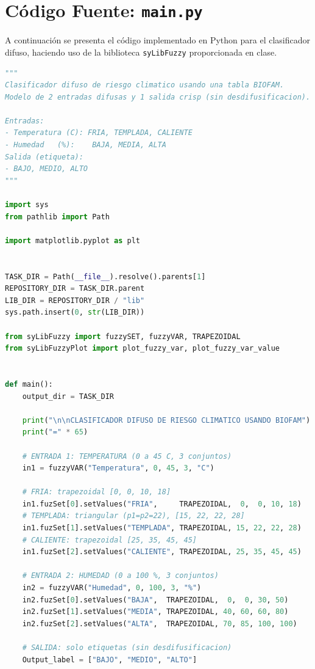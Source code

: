 \documentclass[conference]{IEEEtran}
\begin{document}
\clearpage
\onecolumn
\appendices
\section{Código Fuente: \texttt{main.py}}
\label{app:codigo}

A continuación se presenta el código implementado en Python para el clasificador difuso, haciendo uso de la biblioteca \texttt{syLibFuzzy} proporcionada en clase.

\begin{lstlisting}[language=Python, caption={Implementación del clasificador difuso climático.}]
"""
Clasificador difuso de riesgo climatico usando una tabla BIOFAM.
Modelo de 2 entradas difusas y 1 salida crisp (sin desdifusificacion).

Entradas:
- Temperatura (C): FRIA, TEMPLADA, CALIENTE
- Humedad   (%):    BAJA, MEDIA, ALTA
Salida (etiqueta):
- BAJO, MEDIO, ALTO
"""

import sys
from pathlib import Path

import matplotlib.pyplot as plt


TASK_DIR = Path(__file__).resolve().parents[1]
REPOSITORY_DIR = TASK_DIR.parent
LIB_DIR = REPOSITORY_DIR / "lib"
sys.path.insert(0, str(LIB_DIR))

from syLibFuzzy import fuzzySET, fuzzyVAR, TRAPEZOIDAL
from syLibFuzzyPlot import plot_fuzzy_var, plot_fuzzy_var_value


def main():
    output_dir = TASK_DIR

    print("\n\nCLASIFICADOR DIFUSO DE RIESGO CLIMATICO USANDO BIOFAM")
    print("=" * 65)

    # ENTRADA 1: TEMPERATURA (0 a 45 C, 3 conjuntos)
    in1 = fuzzyVAR("Temperatura", 0, 45, 3, "C")

    # FRIA: trapezoidal [0, 0, 10, 18]
    in1.fuzSet[0].setValues("FRIA",     TRAPEZOIDAL,  0,  0, 10, 18)
    # TEMPLADA: triangular (p1=p2=22), [15, 22, 22, 28]
    in1.fuzSet[1].setValues("TEMPLADA", TRAPEZOIDAL, 15, 22, 22, 28)
    # CALIENTE: trapezoidal [25, 35, 45, 45]
    in1.fuzSet[2].setValues("CALIENTE", TRAPEZOIDAL, 25, 35, 45, 45)

    # ENTRADA 2: HUMEDAD (0 a 100 %, 3 conjuntos)
    in2 = fuzzyVAR("Humedad", 0, 100, 3, "%")
    in2.fuzSet[0].setValues("BAJA",  TRAPEZOIDAL,  0,  0, 30, 50)
    in2.fuzSet[1].setValues("MEDIA", TRAPEZOIDAL, 40, 60, 60, 80)
    in2.fuzSet[2].setValues("ALTA",  TRAPEZOIDAL, 70, 85, 100, 100)

    # SALIDA: solo etiquetas (sin desdifusificacion)
    Output_label = ["BAJO", "MEDIO", "ALTO"]


\end{lstlisting}
\end{document}
